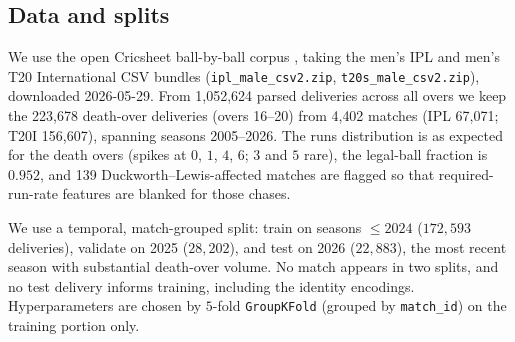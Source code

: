 \subsection{Data and splits}
\label{sec:data}
We use the open Cricsheet ball-by-ball corpus \citep{cricsheet}, taking the
men's IPL and men's T20 International CSV bundles (\texttt{ipl\_male\_csv2.zip},
\texttt{t20s\_male\_csv2.zip}), downloaded 2026-05-29. From 1{,}052{,}624 parsed
deliveries across all overs we keep the 223{,}678 death-over deliveries (overs
16--20) from 4{,}402 matches (IPL 67{,}071; T20I 156{,}607), spanning seasons
2005--2026. The runs distribution is as expected for the death overs (spikes at
$0$, $1$, $4$, $6$; $3$ and $5$ rare), the legal-ball fraction is $0.952$, and
139 Duckworth--Lewis-affected matches are flagged so that required-run-rate
features are blanked for those chases.

We use a temporal, match-grouped split: train on seasons $\le 2024$
($172{,}593$ deliveries), validate on 2025 ($28{,}202$), and test on 2026
($22{,}883$), the most recent season with substantial death-over volume. No match
appears in two splits, and no test delivery informs training, including the
identity encodings. Hyperparameters are chosen by $5$-fold \texttt{GroupKFold}
(grouped by \texttt{match\_id}) on the training portion only.


